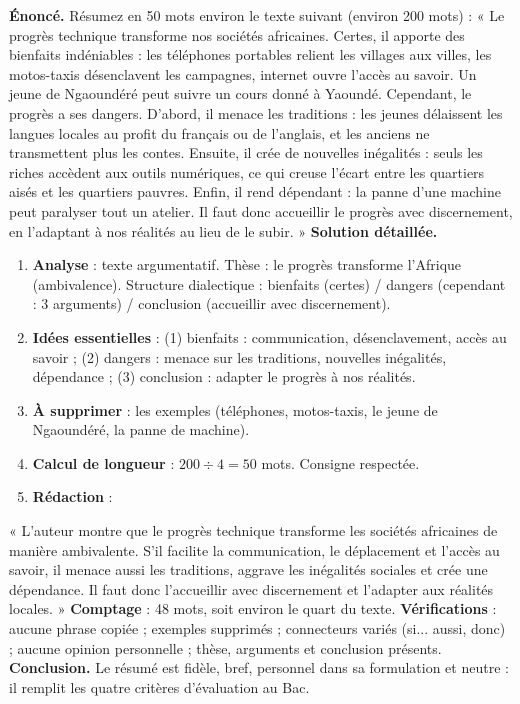 \documentclass[11pt]{article}
\begin{document}
\begin{exoresolu}
\textbf{Énoncé.} Résumez en 50 mots environ le texte suivant (environ 200 mots) : « Le progrès technique transforme nos sociétés africaines. Certes, il apporte des bienfaits indéniables : les téléphones portables relient les villages aux villes, les motos-taxis désenclavent les campagnes, internet ouvre l'accès au savoir. Un jeune de Ngaoundéré peut suivre un cours donné à Yaoundé. Cependant, le progrès a ses dangers. D'abord, il menace les traditions : les jeunes délaissent les langues locales au profit du français ou de l'anglais, et les anciens ne transmettent plus les contes. Ensuite, il crée de nouvelles inégalités : seuls les riches accèdent aux outils numériques, ce qui creuse l'écart entre les quartiers aisés et les quartiers pauvres. Enfin, il rend dépendant : la panne d'une machine peut paralyser tout un atelier. Il faut donc accueillir le progrès avec discernement, en l'adaptant à nos réalités au lieu de le subir. »
\tcblower
\textbf{Solution détaillée.}
\begin{enumerate}
\item \textbf{Analyse} : texte argumentatif. Thèse : le progrès transforme l'Afrique (ambivalence). Structure dialectique : bienfaits (certes) / dangers (cependant : 3 arguments) / conclusion (accueillir avec discernement).
\item \textbf{Idées essentielles} : (1) bienfaits : communication, désenclavement, accès au savoir ; (2) dangers : menace sur les traditions, nouvelles inégalités, dépendance ; (3) conclusion : adapter le progrès à nos réalités.
\item \textbf{À supprimer} : les exemples (téléphones, motos-taxis, le jeune de Ngaoundéré, la panne de machine).
\item \textbf{Calcul de longueur} : $200 \div 4 = 50$ mots. Consigne respectée.
\item \textbf{Rédaction} :
\end{enumerate}
« L'auteur montre que le progrès technique transforme les sociétés africaines de manière ambivalente. S'il facilite la communication, le déplacement et l'accès au savoir, il menace aussi les traditions, aggrave les inégalités sociales et crée une dépendance. Il faut donc l'accueillir avec discernement et l'adapter aux réalités locales. »
\textbf{Comptage} : 48 mots, soit environ le quart du texte. \textbf{Vérifications} : aucune phrase copiée ; exemples supprimés ; connecteurs variés (si... aussi, donc) ; aucune opinion personnelle ; thèse, arguments et conclusion présents.
\textbf{Conclusion.} Le résumé est fidèle, bref, personnel dans sa formulation et neutre : il remplit les quatre critères d'évaluation au Bac.
\end{exoresolu}
\end{document}

